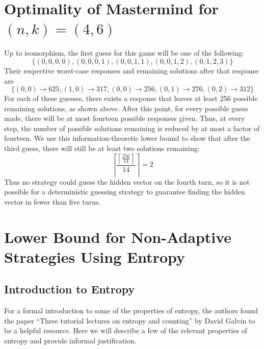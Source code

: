 \documentclass[12pt, a4paper]{article}
\begin{document}
\section*{Optimality of Mastermind for $(n, k) = (4, 6)$}
	Up to isomorphism, the first guess for this game will be one of the
	following:
		\begin{equation*}
		\{(0, 0, 0, 0), (0, 0, 0, 1), (0, 0, 1, 1), (0, 0, 1, 2), (0, 1, 2, 3)\}
		\end{equation*}
		Their respective worst-case responses and remaining solutions after that
		response are
		\begin{equation*}
		\{(0, 0)\rightarrow 625, (1, 0)\rightarrow 317, (0, 0)\rightarrow 256,
		(0, 1)\rightarrow 276, (0, 2)\rightarrow 312\}
		\end{equation*}
	For each of these guesses, there exists a response that leaves at least 256
	possible remaining solutions, as shown above. After this point, for every possible
	guess made, there will be at most fourteen possible responses given. Thus, at every
	step, the number of possible solutions remaining is reduced by at most a factor of
	fourteen. We use this information-theoretic lower bound to show that after the
	third guess, there will still be at least two solutions remaining:
		\begin{equation*}
		\left\lceil\frac{\left\lceil \frac{256}{14}\right\rceil}{14}\right\rceil = 2
		\end{equation*}
	Thus no strategy could guess the hidden vector on the fourth turn, so it is not
	possible for a deterministic guessing strategy to guarantee finding the
	hidden vector in fewer than five turns.

\clearpage
\section*{Lower Bound for Non-Adaptive Strategies Using Entropy}
\subsection*{Introduction to Entropy}
For a formal introduction to some of the properties of entropy, the authors found the
paper ``Three tutorial lectures on entropy and counting'' by David Galvin to be a
helpful resource. Here we will describe a few of the relevant properties of entropy
and provide informal justification.
\end{document}
